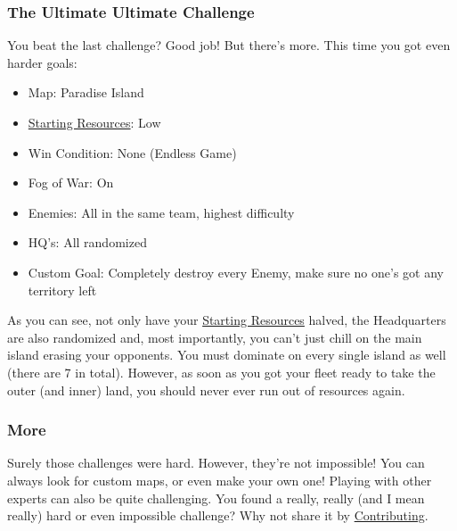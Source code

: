 \documentclass[12pt]{article}
\begin{document}
\subsubsection{The Ultimate Ultimate Challenge}
\label{sec:challenge_ultimate_ultimate}

You beat the last challenge? Good job! But there's more. This time you got even harder goals:

\begin{itemize}
  \item Map: Paradise Island
  \item \hyperref[sec:startingresources]{Starting Resources}: Low
  \item Win Condition: None (Endless Game)
  \item Fog of War: On
  \item Enemies: All in the same team, highest difficulty
  \item HQ's: All randomized
  \item Custom Goal: Completely destroy every Enemy, make sure no one's got any territory left
\end{itemize}

As you can see, not only have your \hyperref[sec:startingresources]{Starting Resources} halved, the Headquarters are also randomized and, most importantly, you can't just chill on the main island erasing your opponents. You must dominate on every single island as well (there are 7 in total). However, as soon as you got your fleet ready to take the outer (and inner) land, you should never ever run out of resources again.

\subsubsection{More}
\label{sec:challenge_more}

Surely those challenges were hard. However, they're not impossible! You can always look for custom maps, or even make your own one! Playing with other experts can also be quite challenging. You found a really, really (and I mean really) hard or even impossible challenge? Why not share it by \hyperref[sec:contributing]{Contributing}.
\end{document}

